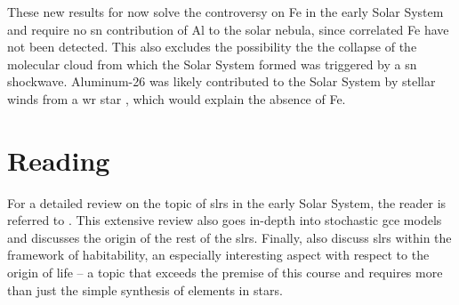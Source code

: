 These new results for now solve the controversy on Fe in the early Solar System and require no \ac{sn} contribution of Al to the solar nebula, since correlated Fe have not been detected. This also excludes the possibility the the collapse of the molecular cloud from which the Solar System formed was triggered by a \ac{sn} shockwave. Aluminum-26 was likely contributed to the Solar System by stellar winds from a \ac{wr} star \citep{dwarkadas17}, which would explain the absence of Fe.


\section{Reading}
For a detailed review on the topic of \acp{slr} in the early Solar System, the reader is referred to \citet{lugaro18rad}. This extensive review also goes in-depth into stochastic \ac{gce} models and discusses the origin of the rest of the \acp{slr}. Finally, \citet{lugaro18rad} also discuss \acp{slr} within the framework of habitability, an especially interesting aspect with respect to the origin of life -- a topic that exceeds the premise of this course and requires more than just the simple synthesis of elements in stars.




